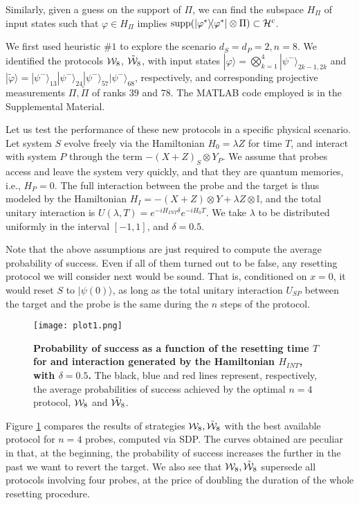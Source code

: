 \documentclass[twocolumn,prx,aps,longbibliography]{revtex4-1}
\def\H{{\cal H}}
\def\id{{\mathbb I}}
\def\H{{\cal H}}
\def\bra#1{\langle#1|} \def\ket#1{|#1\rangle}
\def\proj#1{\ket{#1}\!\bra{#1}}
\def\id{{\mathbb I}}
\begin{document}
\begin{appendix}
Similarly, given a guess on the support of $\Pi$, we can find the subspace $H_\Pi$ of input states such that $\varphi\in H_\Pi$ implies $\mbox{supp}(\proj{\varphi^*}\otimes \Pi)\subset \H^c$.

We first used heuristic $\# 1$ to explore the scenario $d_S=d_P=2,n=8$. We identified the protocols ${\cal W}_8$, $\tilde{{\cal W}}_8$, with input states $\ket{\varphi}=\bigotimes_{k=1}^4\ket{\psi^{-}}_{2k-1,2k}$ and $\ket{\tilde{\varphi}}=\ket{\psi^{-}}_{13}\ket{\psi^{-}}_{24}\ket{\psi^{-}}_{57}\ket{\psi^{-}}_{68}$, respectively, and corresponding projective measurements $\Pi,\tilde{\Pi}$ of ranks $39$ and $78$. The MATLAB code employed is in the Supplemental Material.

Let us test the performance of these new protocols in a specific physical scenario. Let system $S$ evolve freely via the Hamiltonian $H_0=\lambda Z$ for time $T$, and interact with system $P$ through the term $-(X+Z)_S\otimes Y_P$. We assume that probes access and leave the system very quickly, and that they are quantum memories, i.e., $H_P=0$. The full interaction between the probe and the target is thus modeled by the Hamiltonian $H_I=-(X+Z)\otimes Y+ \lambda Z\otimes \id$, and the total unitary interaction is $U(\lambda,T)=e^{-iH_{INT}\delta}e^{-iH_0T}$. We take $\lambda$ to be distributed uniformly in the interval $[-1,1]$, and $\delta=0.5$.

Note that the above assumptions are just required to compute the average probability of success. Even if all of them turned out to be false, any resetting protocol we will consider next would be sound. That is, conditioned on $x=0$, it would reset $S$ to $\ket{\psi(0)}$, as long as the total unitary interaction $U_{SP}$ between the target and the probe is the same during the $n$ steps of the protocol.

\begin{figure}
  \centering
  \texttt{[image: plot1.png]}
  \caption{\textbf{Probability of success as a function of the resetting time $T$ for and interaction generated by the Hamiltonian $H_{INT}$, with $\delta=0.5$.} The black, blue and red lines represent, respectively, the average probabilities of success achieved by the optimal $n=4$ protocol, ${\cal W}_8$ and $\tilde{{\cal W}}_8$.}
  \label{plot1}
\end{figure}


Figure \ref{plot1} compares the results of strategies ${\cal W}_8,\tilde{{\cal W}}_8$ with the best available protocol for $n=4$ probes, computed via SDP. The curves obtained are peculiar in that, at the beginning, the probability of success increases the further in the past we want to revert the target. We also see that ${\cal W}_8,\tilde{{\cal W}}_8$ supersede all protocols involving four probes, at the price of doubling the duration of the whole resetting procedure.


\end{appendix}
\end{document}
